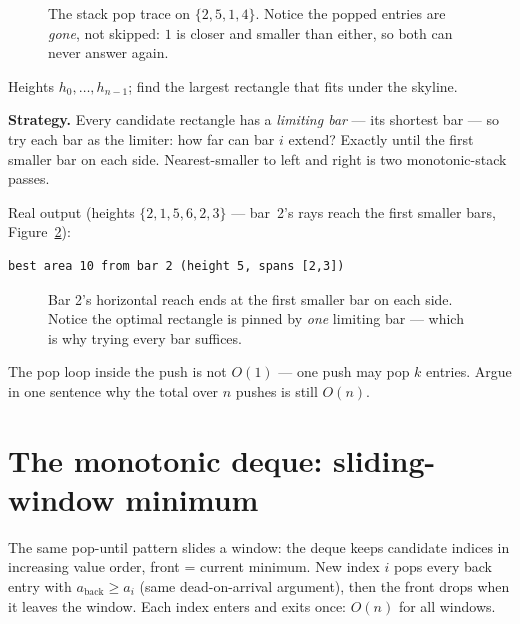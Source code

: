 \begin{figure}[ht]\centering

\caption{The stack pop trace on $\{2,5,1,4\}$. Notice the popped
entries are \emph{gone}, not skipped: $1$ is closer and smaller than
either, so both can never answer again.}
\label{fig:stackpop}
\end{figure}

\begin{example}\label{ex:histogram}
Heights $h_0,\dots,h_{n-1}$; find the largest rectangle that fits
under the skyline.
\par\smallskip
\textbf{Strategy.} Every candidate rectangle has a \emph{limiting
bar} --- its shortest bar --- so try each bar as the limiter: how far
can bar $i$ extend? Exactly until the first smaller bar on each side.
Nearest-smaller to left and right is two monotonic-stack passes.
\par\smallskip
\begin{solution}

Real output (heights $\{2,1,5,6,2,3\}$ --- bar~2's rays reach the
first smaller bars, Figure~\ref{fig:histogram}):
\begin{lstlisting}[numbers=none]
best area 10 from bar 2 (height 5, spans [2,3])
\end{lstlisting}
\end{solution}
\end{example}

\begin{figure}[ht]\centering

\caption{Bar 2's horizontal reach ends at the first smaller bar on
each side. Notice the optimal rectangle is pinned by \emph{one}
limiting bar --- which is why trying every bar suffices.}
\label{fig:histogram}
\end{figure}

\begin{exercise}[easy]\label{exr:amort}
The pop loop inside the push is not $O(1)$ --- one push may pop $k$
entries. Argue in one sentence why the total over $n$ pushes is still
$O(n)$.
\end{exercise}

\section{The monotonic deque: sliding-window minimum}\label{sec:monodeque}

The same pop-until pattern slides a window: the deque keeps candidate
indices in increasing value order, front = current minimum. New index
$i$ pops every back entry with $a_{\text{back}} \ge a_i$ (same
dead-on-arrival argument), then the front drops when it leaves the
window. Each index enters and exits once: $O(n)$ for all windows.

